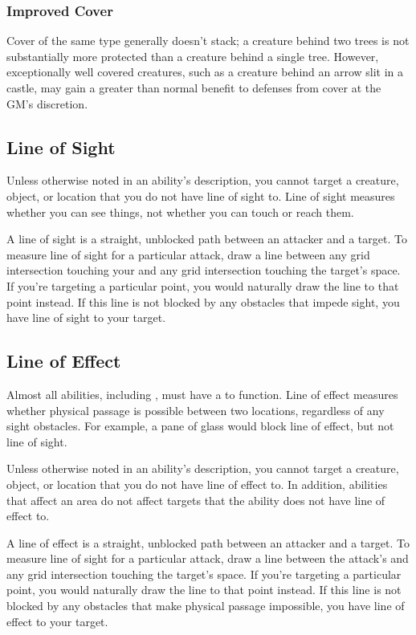             \subsubsection{Improved Cover}
            Cover of the same type generally doesn't stack; a creature behind two trees is not substantially more protected than a creature behind a single tree.
            However, exceptionally well covered creatures, such as a creature behind an arrow slit in a castle, may gain a greater than normal benefit to defenses from cover at the GM's discretion.

    \subsection{Line of Sight}\label{Line of Sight}
        Unless otherwise noted in an ability's description, you cannot target a creature, object, or location that you do not have line of sight to.
        Line of sight measures whether you can see things, not whether you can touch or reach them.

        A line of sight is a straight, unblocked path between an attacker and a target.
        To measure line of sight for a particular attack, draw a line between any grid intersection touching your  and any grid intersection touching the target's space.
        If you're targeting a particular point, you would naturally draw the line to that point instead.
        If this line is not blocked by any obstacles that impede sight, you have line of sight to your target.

    \subsection{Line of Effect}\label{Line of Effect}
        Almost all abilities, including , must have a  to function.
        Line of effect measures whether physical passage is possible between two locations, regardless of any sight obstacles.
        For example, a pane of glass would block line of effect, but not line of sight.

        Unless otherwise noted in an ability's description, you cannot target a creature, object, or location that you do not have line of effect to.
        In addition, abilities that affect an area do not affect targets that the ability does not have line of effect to.

        A line of effect is a straight, unblocked path between an attacker and a target.
        To measure line of sight for a particular attack, draw a line between the attack's  and any grid intersection touching the target's space.
        If you're targeting a particular point, you would naturally draw the line to that point instead.
        If this line is not blocked by any obstacles that make physical passage impossible, you have line of effect to your target.

